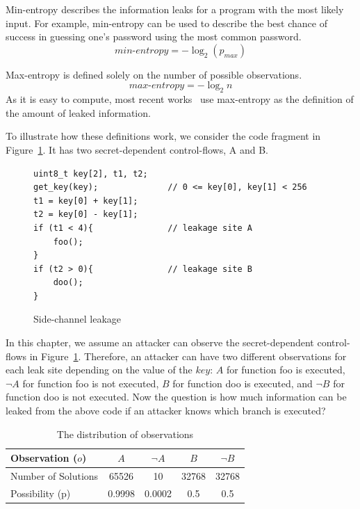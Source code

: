 Min-entropy describes the information leaks for a program with the most likely input.
For example, min-entropy can be used to describe the
best chance of success in guessing one's password using the
most common password. %
\begin{displaymath}
    \mathit{min\text{-}entropy} = - \log_2(p_{\mathit{max}})
\end{displaymath}

Max-entropy is defined solely on the number of possible observations.
\begin{displaymath}
    \mathit{max\text{-}entropy} = -\log_2{n}
\end{displaymath}
As it is easy to compute, most recent works~\cite{182946,Doychev:2017:RAS:3062341.3062388} use max-entropy as the definition of
the amount of leaked information.

To illustrate how these definitions work, we consider the code
fragment in Figure~\ref{fig:side-channel}. It has two secret-dependent
control-flows, A and B.

\begin{figure}[h!]
    \centering
    \begin{lstlisting}[xleftmargin=.1\textwidth, xrightmargin=.1\textwidth]
uint8_t key[2], t1, t2;
get_key(key);              // 0 <= key[0], key[1] < 256
t1 = key[0] + key[1];
t2 = key[0] - key[1];
if (t1 < 4){               // leakage site A
    foo();    
}                          
if (t2 > 0){               // leakage site B     
    doo();    
}                          
\end{lstlisting}
    \caption{Side-channel leakage}
    \label{fig:side-channel}
\end{figure}
In this chapter, we assume an attacker can observe the secret-dependent control-flows in Figure~\ref{fig:side-channel}.
Therefore, an attacker can have two different observations for each leak site
depending on the value of the $\mathit{key}$: $A$ for function \textsf{foo} is executed,
$\neg A$ for function \textsf{foo} is not executed, $B$ for function \textsf{doo} is
executed, and $\neg B$ for function \textsf{doo} is not executed. Now the
question is how much information can be leaked from the above code if an
attacker knows which branch is executed?

\begin{table}[ht]
    \centering%
    \caption{The distribution of observations}\label{shtable}
    \begin{tabular}{l|cc|cc}
        \hline

        Observation ($o$)   & $A$    & $\neg A$ & $B$   & $\neg B$ \\ \hline
        Number of Solutions & 65526  & 10       & 32768 & 32768    \\ \hline
        Possibility (p)     & 0.9998 & 0.0002   & 0.5   & 0.5      \\
        \hline
    \end{tabular}
\end{table}

